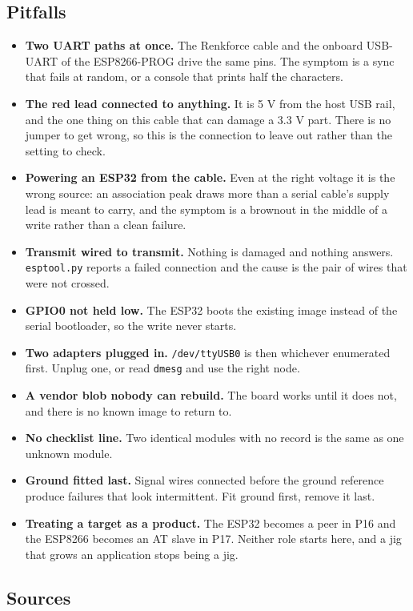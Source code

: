 \subsection*{Pitfalls}

\begin{itemize}
\item \textbf{Two UART paths at once.} The Renkforce cable and the onboard USB-UART of the ESP8266-PROG drive the same pins. The symptom is a sync that fails at random, or a console that prints half the characters.
\item \textbf{The red lead connected to anything.} It is 5 V from the host USB rail, and the one thing on this cable that can damage a 3.3 V part. There is no jumper to get wrong, so this is the connection to leave out rather than the setting to check.
\item \textbf{Powering an ESP32 from the cable.} Even at the right voltage it is the wrong source: an association peak draws more than a serial cable's supply lead is meant to carry, and the symptom is a brownout in the middle of a write rather than a clean failure.
\item \textbf{Transmit wired to transmit.} Nothing is damaged and nothing answers. \texttt{esptool.py} reports a failed connection and the cause is the pair of wires that were not crossed.
\item \textbf{GPIO0 not held low.} The ESP32 boots the existing image instead of the serial bootloader, so the write never starts.
\item \textbf{Two adapters plugged in.} \texttt{/dev/ttyUSB0} is then whichever enumerated first. Unplug one, or read \texttt{dmesg} and use the right node.
\item \textbf{A vendor blob nobody can rebuild.} The board works until it does not, and there is no known image to return to.
\item \textbf{No checklist line.} Two identical modules with no record is the same as one unknown module.
\item \textbf{Ground fitted last.} Signal wires connected before the ground reference produce failures that look intermittent. Fit ground first, remove it last.
\item \textbf{Treating a target as a product.} The ESP32 becomes a peer in P16 and the ESP8266 becomes an AT slave in P17. Neither role starts here, and a jig that grows an application stops being a jig.
\end{itemize}

\subsection*{Sources}

